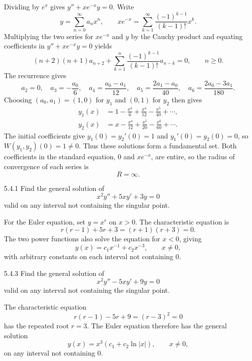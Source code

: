 \documentclass[11pt,oneside]{article}
\begin{document}
\begin{solution}
Dividing by $e^x$ gives $y''+xe^{-x}y=0$. Write
\[
    y=\sum_{n=0}^{\infty}a_nx^n,
    \qquad xe^{-x}=\sum_{k=1}^{\infty}\frac{(-1)^{k-1}}{(k-1)!}x^k.
\]
Multiplying the two series for $xe^{-x}$ and $y$ by the Cauchy product and equating coefficients in $y''+xe^{-x}y=0$ yields
\[
    (n+2)(n+1)a_{n+2}
      +\sum_{k=1}^{n}\frac{(-1)^{k-1}}{(k-1)!}a_{n-k}=0,
    \qquad n\geq0.
\]
The recurrence gives
\[
    a_2=0, \quad a_3=-\frac{a_0}{6}, \quad a_4=\frac{a_0-a_1}{12},
    \quad a_5=\frac{2a_1-a_0}{40}, \quad a_6=\frac{2a_0-3a_1}{180}.
\]
Choosing $(a_0, a_1)=(1, 0)$ for $y_1$ and $(0, 1)$ for $y_2$ then gives
\[
    \boxed{\begin{aligned}
      y_1(x)&=1-\frac{x^3}{6}+\frac{x^4}{12}-\frac{x^5}{40}+\cdots,\\
      y_2(x)&=x-\frac{x^4}{12}+\frac{x^5}{20}-\frac{x^6}{60}+\cdots.
    \end{aligned}}
\]
The initial coefficients give $y_1(0)=y_2'(0)=1$ and $y_1'(0)=y_2(0)=0$, so $W(y_1, y_2)(0)=1\ne0$. Thus these solutions form a fundamental set. Both coefficients in the standard equation, $0$ and $xe^{-x}$, are entire, so the radius of convergence of each series is
\[
    \boxed{R=\infty}.
\]
\end{solution}

\begin{problem}{5.4.1}
Find the general solution of
\[
    x^2y''+5xy'+3y=0
\]
valid on any interval not containing the singular point.
\end{problem}

\begin{solution}
For the Euler equation, set $y=x^r$ on $x>0$. The characteristic equation is
\[
    r(r-1)+5r+3=(r+1)(r+3)=0.
\]
The two power functions also solve the equation for $x<0$, giving
\[
    \boxed{y(x)=c_1x^{-1}+c_2x^{-3}}, \qquad x\ne0,
\]
with arbitrary constants on each interval not containing $0$.
\end{solution}

\begin{problem}{5.4.3}
Find the general solution of
\[
    x^2y''-5xy'+9y=0
\]
valid on any interval not containing the singular point.
\end{problem}

\begin{solution}
The characteristic equation
\[
    r(r-1)-5r+9=(r-3)^2=0
\]
has the repeated root $r=3$. The Euler equation therefore has the general solution
\[
    \boxed{y(x)=x^3(c_1+c_2\ln|x|)}, \qquad x\ne0,
\]
on any interval not containing $0$.
\end{solution}
\end{document}
